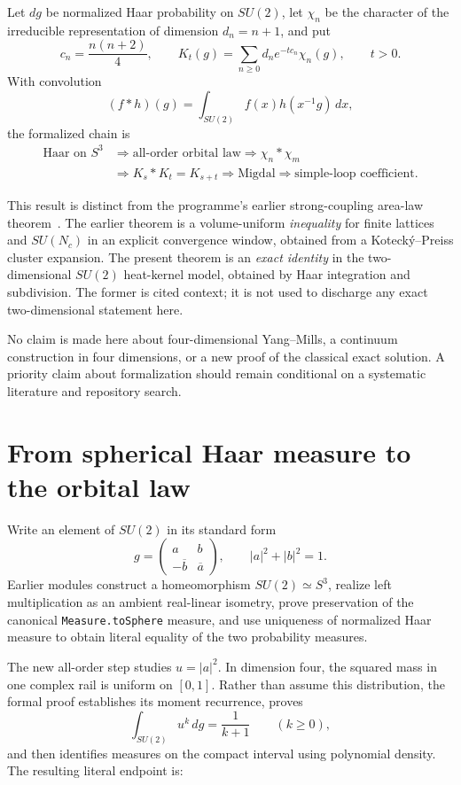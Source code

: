 \documentclass[11pt,a4paper]{article}
\theoremstyle{remark}
\begin{document}
Let $dg$ be normalized Haar probability on $SU(2)$, let $\chi_n$ be the
character of the irreducible representation of dimension $d_n=n+1$, and put
\[
  c_n=\frac{n(n+2)}4,
  \qquad
  K_t(g)=\sum_{n\ge0}d_n e^{-tc_n}\chi_n(g),\qquad t>0.
\]
With convolution
\[
  (f*h)(g)=\int_{SU(2)}f(x)h(x^{-1}g)\,dx,
\]
the formalized chain is
\[
  \begin{aligned}
  \text{Haar on }S^3
  &\Longrightarrow \text{all-order orbital law}
  \Longrightarrow \chi_n*\chi_m\\
  &\Longrightarrow K_s*K_t=K_{s+t}
  \Longrightarrow \text{Migdal}
  \Longrightarrow \text{simple-loop coefficient}.
  \end{aligned}
\]

This result is distinct from the programme's earlier strong-coupling area-law
theorem~\cite{ErikssonStrongCoupling}.  The earlier theorem is a volume-uniform \emph{inequality} for finite
lattices and $SU(N_c)$ in an explicit convergence window, obtained from a
Koteck\'y--Preiss cluster expansion.  The present theorem is an \emph{exact
identity} in the two-dimensional $SU(2)$ heat-kernel model, obtained by Haar
integration and subdivision.  The former is cited context; it is not used to
discharge any exact two-dimensional statement here.

No claim is made here about four-dimensional Yang--Mills, a continuum
construction in four dimensions, or a new proof of the classical exact
solution.  A priority claim about formalization should remain conditional on a
systematic literature and repository search.

\section{From spherical Haar measure to the orbital law}

Write an element of $SU(2)$ in its standard form
\[
  g=\begin{pmatrix}a&b\\-\overline b&\overline a\end{pmatrix},
  \qquad |a|^2+|b|^2=1.
\]
Earlier modules construct a homeomorphism $SU(2)\simeq S^3$, realize left
multiplication as an ambient real-linear isometry, prove preservation of the
canonical \texttt{Measure.toSphere} measure, and use uniqueness of normalized
Haar measure to obtain literal equality of the two probability measures.

The new all-order step studies $u=|a|^2$.  In dimension four, the squared mass
in one complex rail is uniform on $[0,1]$.  Rather than assume this distribution,
the formal proof establishes its moment recurrence, proves
\[
  \int_{SU(2)}u^k\,dg=\frac1{k+1}\qquad(k\ge0),
\]
and then identifies measures on the compact interval using polynomial density.
The resulting literal endpoint is:
\end{document}
